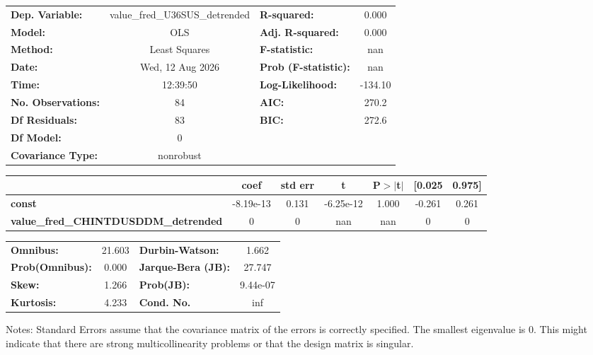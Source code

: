 \begin{center}
\begin{tabular}{lclc}
\toprule
\textbf{Dep. Variable:}                      & value\_fred\_U36SUS\_detrended & \textbf{  R-squared:         } &     0.000   \\
\textbf{Model:}                              &              OLS               & \textbf{  Adj. R-squared:    } &     0.000   \\
\textbf{Method:}                             &         Least Squares          & \textbf{  F-statistic:       } &       nan   \\
\textbf{Date:}                               &        Wed, 12 Aug 2026        & \textbf{  Prob (F-statistic):} &      nan    \\
\textbf{Time:}                               &            12:39:50            & \textbf{  Log-Likelihood:    } &   -134.10   \\
\textbf{No. Observations:}                   &                 84             & \textbf{  AIC:               } &     270.2   \\
\textbf{Df Residuals:}                       &                 83             & \textbf{  BIC:               } &     272.6   \\
\textbf{Df Model:}                           &                  0             & \textbf{                     } &             \\
\textbf{Covariance Type:}                    &           nonrobust            & \textbf{                     } &             \\
\bottomrule
\end{tabular}
\begin{tabular}{lcccccc}
                                             & \textbf{coef} & \textbf{std err} & \textbf{t} & \textbf{P$> |$t$|$} & \textbf{[0.025} & \textbf{0.975]}  \\
\midrule
\textbf{const}                               &    -8.19e-13  &        0.131     & -6.25e-12  &         1.000        &       -0.261    &        0.261     \\
\textbf{value\_fred\_CHINTDUSDDM\_detrended} &            0  &            0     &       nan  &           nan        &            0    &            0     \\
\bottomrule
\end{tabular}
\begin{tabular}{lclc}
\textbf{Omnibus:}       & 21.603 & \textbf{  Durbin-Watson:     } &    1.662  \\
\textbf{Prob(Omnibus):} &  0.000 & \textbf{  Jarque-Bera (JB):  } &   27.747  \\
\textbf{Skew:}          &  1.266 & \textbf{  Prob(JB):          } & 9.44e-07  \\
\textbf{Kurtosis:}      &  4.233 & \textbf{  Cond. No.          } &      inf  \\
\bottomrule
\end{tabular}
\end{center}

Notes: \newline
 [1] Standard Errors assume that the covariance matrix of the errors is correctly specified. \newline
 [2] The smallest eigenvalue is      0. This might indicate that there are \newline
 strong multicollinearity problems or that the design matrix is singular.